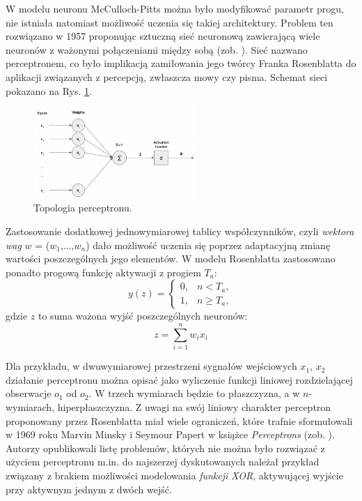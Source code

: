 W modelu neuronu McCulloch-Pitts można było modyfikować parametr progu, nie istniała natomiast możliwość uczenia się takiej architektury. Problem ten rozwiązano w 1957 proponując sztuczną sieć neuronową zawierającą wiele neuronów z ważonymi połączeniami między sobą (zob. \cite{Rosenblatt1957}). Sieć nazwano perceptronem, co było implikacją zamiłowania jego twórcy Franka Rosenblatta do aplikacji związanych z percepcją, zwłaszcza mowy czy pisma. Schemat sieci pokazano na Rys. \ref{Perceptron}.
\begin{figure}[h!]
	\centering
	\includegraphics[width=0.55\textwidth]{figures/perceptron.png}
	\caption{Topologia perceptronu.}
	\label{Perceptron}
\end{figure}

Zastosowanie dodatkowej jednowymiarowej tablicy współczynników, czyli \textit{wektora wag} $w$ = ($w_1$,...,$w_n$) dało możliwość uczenia się poprzez adaptacyjną zmianę wartości poszczególnych jego elementów. W modelu Rosenblatta zastosowano ponadto progową funkcję aktywacji z progiem $T_a$:
\begin{equation}
y(z)=\begin{cases} 0, & n < T_a, \\ 1, & n \ge T_a, \end{cases}
\end{equation}
gdzie $z$ to suma ważona wyjść poszczególnych neuronów:
\begin{equation}
\label{eqLinActFunc}
z=\sum_{i=1}^{n}w_i x_i
\end{equation}

Dla przykładu, w dwuwymiarowej przestrzeni sygnałów wejściowych {$x_1$, $x_2$}  działanie perceptronu można opisać jako wyliczenie funkcji liniowej rozdzielającej obserwacje $o_1$ od $o_2$. W trzech wymiarach będzie to płaszczyzna, a w $n$-wymiarach, hiperpłaszczyzna. Z uwagi na swój liniowy charakter perceptron proponowany przez Rosenblatta miał wiele ograniczeń, które trafnie sformułowali w 1969 roku Marvin Minsky i Seymour Papert w książce \textit{Perceptrons} (zob. \cite{Minsky1969}). Autorzy opublikowali listę problemów, których nie można było rozwiązać z użyciem perceptronu m.in. do najszerzej dyskutowanych należał przykład związany z brakiem możliwości modelowania \textit{funkcji XOR}, aktywującej wyjście przy aktywnym jednym z dwóch wejść.

